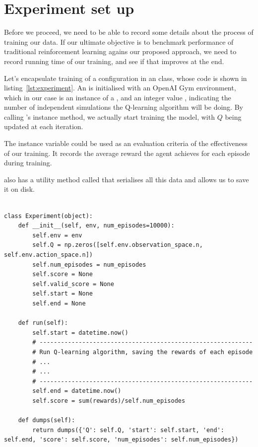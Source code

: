 
\section{Experiment set up}
Before we proceed, we need to be able to record some details about the process of training our data. If our ultimate objective is to benchmark performance of traditional reinforcement learning agains our proposed approach, we need to record running time of our training, and see if that improves at the end. 

Let's encapsulate training of a configuration in an  class, whose code is shown in listing~\ref{lst:experiment}. An  is initialised with an OpenAI Gym environment, which in our case is an instance of a , and an integer value , indicating the number of independent simulations the Q-learning algorithm will be doing. By calling 's  instance method, we actually start training the model, with $Q$ being updated at each iteration.

The instance variable  could be used as an evaluation criteria of the effectiveness of our training. It records the average reward the agent achieves for each episode during training.

 also has a utility method called  that serialises all this data and allows us to save it on disk.
\\\\
\begin{minipage}{\linewidth}
\lstset{language=Python}
\lstset{frame=lines}
\lstset{basicstyle=\footnotesize}
\begin{lstlisting}
class Experiment(object):
    def __init__(self, env, num_episodes=10000):
        self.env = env
        self.Q = np.zeros([self.env.observation_space.n, self.env.action_space.n])
        self.num_episodes = num_episodes
        self.score = None
        self.valid_score = None
        self.start = None
        self.end = None
            
    def run(self):
        self.start = datetime.now()
        # ------------------------------------------------------------
        # Run Q-learning algorithm, saving the rewards of each episode
        # ...
        # ...
        # ------------------------------------------------------------
        self.end = datetime.now()
        self.score = sum(rewards)/self.num_episodes
        
    def dumps(self):
        return dumps({'Q': self.Q, 'start': self.start, 'end': self.end, 'score': self.score, 'num_episodes': self.num_episodes})
\end{lstlisting}
\end{minipage}

